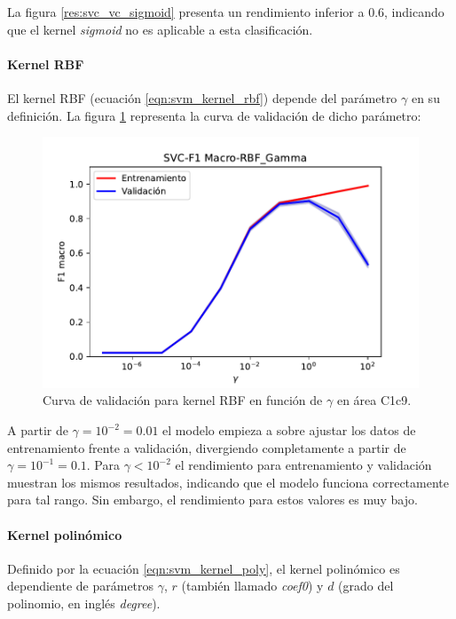 La figura \ref{res:svc_vc_sigmoid} presenta un rendimiento inferior a 0.6, indicando que el kernel \textit{sigmoid} no es aplicable a esta clasificación.

\paragraph{Kernel RBF}

El kernel RBF (ecuación \ref{eqn:svm_kernel_rbf}) depende del parámetro $\gamma$ en su definición. La figura \ref{res:svc_vc_rbf_gamma} representa la curva de validación de dicho parámetro:

\begin{figure}[H]
	\centering
	\captionsetup{justification=centering}
	\includegraphics[width=\textwidth]{imagenes/resultados/svm/curvas_validacion/SVC-F1 Macro-RBF_Gamma.pdf}
	\caption{Curva de validación para kernel RBF en función de $\gamma$ en área C1c9.}
	\label{res:svc_vc_rbf_gamma}
\end{figure}

A partir de $\gamma = 10^{-2} = 0.01$ el modelo empieza a sobre ajustar los datos de entrenamiento frente a validación, divergiendo completamente a partir de $\gamma=10^{-1}=0.1$. Para $\gamma<10^{-2}$ el rendimiento para entrenamiento y validación muestran los mismos resultados, indicando que el modelo funciona correctamente para tal rango. Sin embargo, el rendimiento para estos valores es muy bajo.

\paragraph{Kernel polinómico}

Definido por la ecuación \ref{eqn:svm_kernel_poly}, el kernel polinómico es dependiente de parámetros $\gamma$, $r$ (también llamado \textit{coef0}) y $d$ (grado del polinomio, en inglés \textit{degree}).


